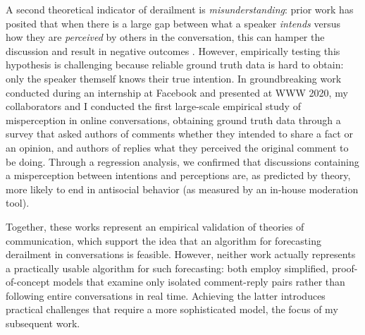 \documentclass[11pt,letterpaper]{article}
\begin{document}
A second theoretical indicator of derailment is \emph{misunderstanding}: prior work has posited that when there is a large gap between what a speaker \emph{intends} versus how they are \emph{perceived} by others in the conversation, this can hamper the discussion and result in negative outcomes \cite{tannen_indirectness_2000}.
However, empirically testing this hypothesis is challenging because reliable ground truth data is hard to obtain: only the speaker themself knows their true intention.
In groundbreaking work conducted during an internship at Facebook and presented at WWW 2020, my collaborators and I conducted the first large-scale empirical study of misperception in online conversations, obtaining ground truth data through a survey that asked authors of comments whether they intended to share a fact or an opinion, and authors of replies what they perceived the original comment to be doing.
Through a regression analysis, we confirmed that discussions containing a misperception between intentions and perceptions are, as predicted by theory, more likely to end in antisocial behavior (as measured by an in-house moderation tool).

Together, these works represent an empirical validation of theories of communication, which support the idea that an algorithm for forecasting derailment in conversations is feasible.
However, neither work actually represents a practically usable algorithm for such forecasting: both employ simplified, proof-of-concept models that examine only isolated comment-reply pairs rather than following entire conversations in real time.
Achieving the latter introduces practical challenges that require a more sophisticated model, the focus of my subsequent work.

\vspace{\baselineskip}


\end{document}
